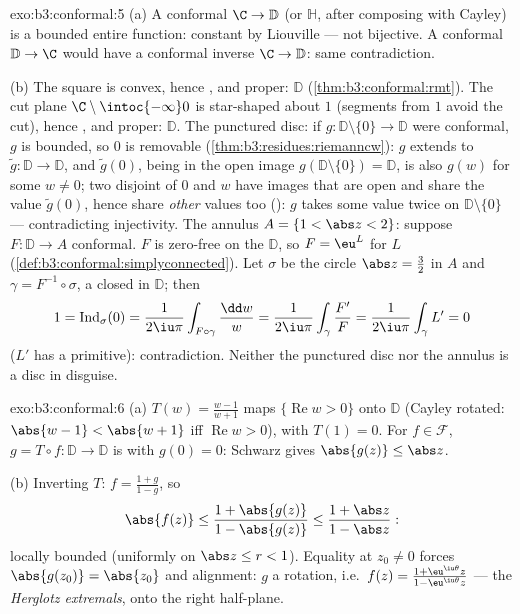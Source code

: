 \begin{solution}{exo:b3:conformal:5}
(a) A conformal $\C \to \mathbb D$ (or $\mathbb H$, after
composing with Cayley) is a bounded entire function:
constant by Liouville --- not bijective. A conformal $\mathbb
D \to \C$ would have a conformal inverse $\C \to \mathbb D$:
same contradiction.

(b) The square is convex, hence , and proper:
 $\mathbb D$ (\cref{thm:b3:conformal:rmt}). The cut
plane $\C\setminus\intoc{-\infty}0$ is star-shaped about $1$
(segments from $1$ avoid the cut), hence ,
and proper:  $\mathbb D$. The punctured disc: if
$g \colon \mathbb D\setminus\{0\} \to \mathbb D$ were
conformal, $g$ is bounded, so $0$ is removable
(\cref{thm:b3:residues:riemanncw}): $g$ extends to $\tilde g
\colon \mathbb D \to \mathbb D$, and $\tilde g(0)$, being in
the open image $g(\mathbb D\setminus\{0\}) = \mathbb D$, is
also $g(w)$ for some $w \neq 0$; two disjoint 
of $0$ and $w$ have images that are open and share the value
$\tilde g(0)$, hence share \emph{other} values too (): $g$ takes some value twice on
$\mathbb D\setminus\{0\}$ --- contradicting injectivity. The
annulus $A = \{1 < \abs z < 2\}$: suppose $F \colon \mathbb D
\to A$ conformal. $F$ is zero-free on the 
$\mathbb D$, so $F = \eu^L$ for  $L$
(\cref{def:b3:conformal:simplyconnected}). Let $\sigma$ be
the circle $\abs z = \frac32$ in $A$ and $\gamma =
F^{-1}\circ\sigma$, a closed  in $\mathbb D$; then
\[
1 = \operatorname{Ind}_\sigma(0)
= \frac1{2\iu\pi}\int_{F\circ\gamma}\frac{\dd w}{w}
= \frac1{2\iu\pi}\int_\gamma\frac{F'}{F}
= \frac1{2\iu\pi}\int_\gamma L' = 0
\]
($L'$ has a primitive): contradiction. Neither the punctured
disc nor the annulus is a disc in disguise.
\end{solution}

\begin{solution}{exo:b3:conformal:6}
(a) $T(w) = \frac{w - 1}{w + 1}$ maps $\{\operatorname{Re}w >
0\}$  onto $\mathbb D$ (Cayley rotated: $\abs{w -
1} < \abs{w + 1}$ iff $\operatorname{Re}w > 0$), with $T(1) =
0$. For $f \in \mathcal F$, $g = T\circ f\colon \mathbb D \to
\mathbb D$ is  with $g(0) = 0$: Schwarz gives
$\abs{g(z)} \leq \abs z$.

(b) Inverting $T$: $f = \frac{1 + g}{1 - g}$, so
\[
\abs{f(z)} \leq \frac{1 + \abs{g(z)}}{1 - \abs{g(z)}}
\leq \frac{1 + \abs z}{1 - \abs z} :
\]
locally bounded (uniformly on $\abs z \leq r < 1$). Equality
at $z_0 \neq 0$ forces $\abs{g(z_0)} = \abs{z_0}$ and
alignment: $g$ a rotation, i.e.\ $f(z) = \frac{1 +
\eu^{\iu\theta}z}{1 - \eu^{\iu\theta}z}$ --- the
\emph{Herglotz extremals},  onto the right
half-plane.
\end{solution}

